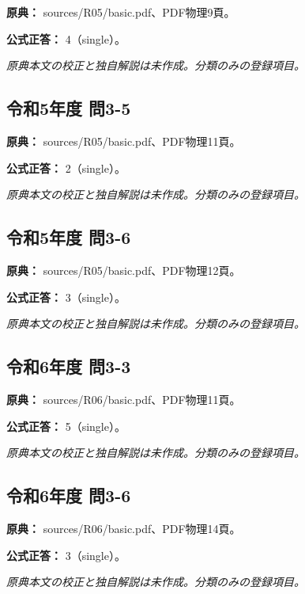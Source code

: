 \noindent\textbf{原典：} sources/R05/basic.pdf、PDF物理9頁。

\textbf{公式正答：} 4（single）。

\par\textit{原典本文の校正と独自解説は未作成。分類のみの登録項目。}

\subsection{令和5年度 問3-5}
\label{q:r05-reg-basic-3-5}

\noindent\textbf{原典：} sources/R05/basic.pdf、PDF物理11頁。

\textbf{公式正答：} 2（single）。

\par\textit{原典本文の校正と独自解説は未作成。分類のみの登録項目。}

\subsection{令和5年度 問3-6}
\label{q:r05-reg-basic-3-6}

\noindent\textbf{原典：} sources/R05/basic.pdf、PDF物理12頁。

\textbf{公式正答：} 3（single）。

\par\textit{原典本文の校正と独自解説は未作成。分類のみの登録項目。}

\subsection{令和6年度 問3-3}
\label{q:r06-reg-basic-3-3}

\noindent\textbf{原典：} sources/R06/basic.pdf、PDF物理11頁。

\textbf{公式正答：} 5（single）。

\par\textit{原典本文の校正と独自解説は未作成。分類のみの登録項目。}

\subsection{令和6年度 問3-6}
\label{q:r06-reg-basic-3-6}

\noindent\textbf{原典：} sources/R06/basic.pdf、PDF物理14頁。

\textbf{公式正答：} 3（single）。

\par\textit{原典本文の校正と独自解説は未作成。分類のみの登録項目。}

